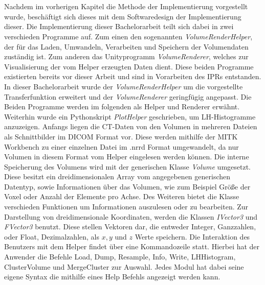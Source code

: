 \chapter{}
\label{sec:concept}


Nachdem im vorherigen Kapitel die Methode der Implementierung vorgestellt wurde, beschäftigt sich dieses mit dem Softwaredesign der Implementierung dieser.
\newline
Die Implementierung dieser Bachelorarbeit teilt sich dabei in zwei verschieden Programme auf. Zum einen den sogenannten \textit{VolumeRenderHelper}, der für das Laden, Umwandeln, Verarbeiten und Speichern der Volumendaten zuständig ist. Zum anderen das Unityprogramm \textit{VolumeRenderer}, welches zur Visualisierung der vom Helper erzeugten Daten dient. Diese beiden Programme existierten bereits vor dieser Arbeit und sind in Vorarbeiten des IPRs entstanden. In dieser Bachelorarbeit wurde der \textit{VolumeRenderHelper} um die vorgestellte Transferfunktion erweitert und der \textit{VolumeRenderer} geringfügig angepasst. Die Beiden Programme werden im folgenden als Helper und Renderer erwähnt. Weiterhin wurde ein Pythonskript \textit{PlotHelper} geschrieben, um LH-Histogramme anzuzeigen.
\newline
{}
Anfangs liegen die CT-Daten von den Volumen in mehreren Dateien als Schnittbilder im DICOM Format vor. Diese werden mithilfe der MITK Workbench zu einer einzelnen Datei im .nrrd Format umgewandelt, da nur Volumen in diesem Format vom Helper eingelesen werden können.
\newline
Die interne Speicherung des Volumens wird mit der generischen Klasse \textit{Volume} umgesetzt. Diese besitzt ein dreidimensionalen Array vom angegebenen generischen Datentyp, sowie Informationen über das Volumen, wie zum Beispiel Größe der Voxel oder Anzahl der Elemente pro Achse. Des Weiteren bietet die Klasse verschieden Funktionen um Informationen auszulesen oder zu bearbeiten. Zur Darstellung von dreidimensionale Koordinaten, werden die Klassen \textit{IVector3} und \textit{FVector3} benutzt. Diese stellen Vektoren dar, die entweder Integer, Ganzzahlen, oder Float, Dezimalzahlen, als $x,y$ und $z$ Werte speichern.
\newline
{}
Die Interaktion des Benutzers mit dem Helper findet über eine Kommandozeile statt. Hierbei hat der Anwender die Befehle Load, Dump, Resample, Info, Write, LHHistogram, ClusterVolume und MergeCluster zur Auswahl. Jedes Modul hat dabei seine eigene Syntax die mithilfe eines Help Befehls angezeigt werden kann.
